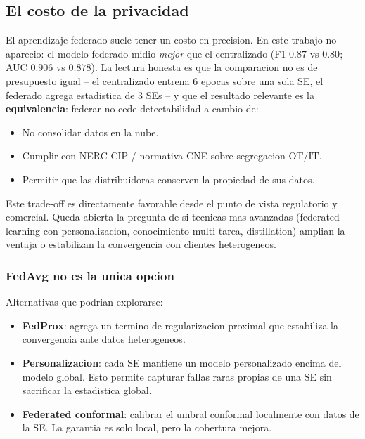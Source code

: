 \subsection{El costo de la privacidad}

El aprendizaje federado suele tener un costo en precision. En este
trabajo no aparecio: el modelo federado midio \emph{mejor} que el
centralizado (F1 $0.87$ vs $0.80$; AUC $0.906$ vs $0.878$). La
lectura honesta es que la comparacion no es de presupuesto igual
-- el centralizado entrena 6 epocas sobre una sola SE, el federado
agrega estadistica de 3 SEs -- y que el resultado relevante es la
\textbf{equivalencia}: federar no cede detectabilidad a cambio de:

\begin{itemize}[leftmargin=*,itemsep=2pt]
  \item No consolidar datos en la nube.
  \item Cumplir con NERC CIP / normativa CNE sobre segregacion OT/IT.
  \item Permitir que las distribuidoras conserven la propiedad de
        sus datos.
\end{itemize}

Este trade-off es directamente favorable desde el punto de vista
regulatorio y comercial. Queda abierta la pregunta de si tecnicas
mas avanzadas (federated learning con personalizacion,
conocimiento multi-tarea, distillation) amplian la ventaja o
estabilizan la convergencia con clientes heterogeneos.

\subsubsection{FedAvg no es la unica opcion}

Alternativas que podrian explorarse:
\begin{itemize}[leftmargin=*,itemsep=2pt]
  \item \textbf{FedProx}: agrega un termino de regularizacion
        proximal que estabiliza la convergencia ante datos
        heterogeneos.
  \item \textbf{Personalizacion}: cada SE mantiene un modelo
        personalizado encima del modelo global. Esto permite
        capturar fallas raras propias de una SE sin sacrificar la
        estadistica global.
  \item \textbf{Federated conformal}: calibrar el umbral conformal
        localmente con datos de la SE. La garantia es solo local,
        pero la cobertura mejora.
\end{itemize}

